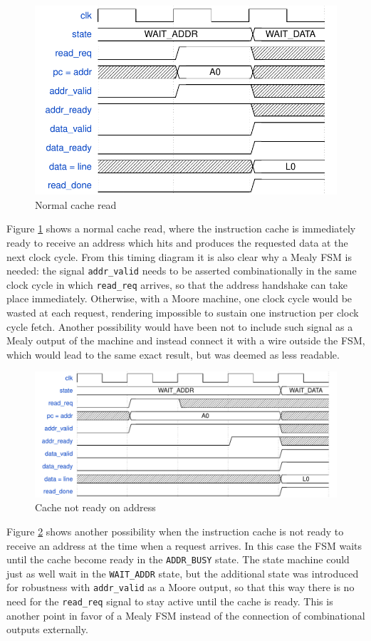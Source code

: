 \begin{figure}[hbt]
  \centering
  \includegraphics{img/cache01.pdf}
  \caption{Normal cache read}
  \label{fig:cache01}
\end{figure}
Figure \ref{fig:cache01} shows a normal cache read, where the instruction cache is immediately ready to receive an address which hits and produces the requested data at the next clock cycle. From this timing diagram it is also clear why a Mealy \acs{FSM} is needed: the signal \texttt{addr\_valid} needs to be asserted combinationally in the same clock cycle in which \texttt{read\_req} arrives, so that the address handshake can take place immediately. Otherwise, with a Moore machine, one clock cycle would be wasted at each request, rendering impossible to sustain one instruction per clock cycle fetch. Another possibility would have been not to include such signal as a Mealy output of the machine and instead connect it with a wire outside the \acs{FSM}, which would lead to the same exact result, but was deemed as less readable.

\begin{figure}[hbt]
  \centering
  \includegraphics[width=\textwidth]{img/cache02.pdf}
  \caption{Cache not ready on address}
  \label{fig:cache02}
\end{figure}
Figure \ref{fig:cache02} shows another possibility when the instruction cache is not ready to receive an address at the time when a request arrives. In this case the \acs{FSM} waits until the cache become ready in the \texttt{ADDR\_BUSY} state. The state machine could just as well wait in the \texttt{WAIT\_ADDR} state, but the additional state was introduced for robustness with \texttt{addr\_valid} as a Moore output, so that this way there is no need for the \texttt{read\_req} signal to stay active until the cache is ready. This is another point in favor of a Mealy \acs{FSM} instead of the connection of combinational outputs externally.

